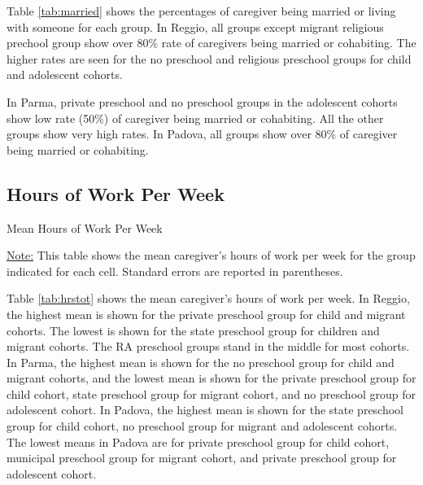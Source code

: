 \documentclass[12pt]{article}
\begin{document}
Table \ref{tab:married} shows the percentages of caregiver being married or living with someone for each group. In Reggio, all groups except migrant religious prechool group show over 80\% rate of caregivers being married or cohabiting. The higher rates are seen for the no preschool and religious preschool groups for child and adolescent cohorts. 

In Parma, private preschool and no preschool groups in the adolescent cohorts show low rate (50\%) of caregiver being married or cohabiting. All the other groups show very high rates. In Padova, all groups show over 80\% of caregiver being married or cohabiting. 


\subsection{Hours of Work Per Week}
\begin{table}[H]
\caption{Mean Hours of Work Per Week} \label{tab:hrstot}
\begin{center}
\scalebox{0.8}{

}
\end{center}
\begin{footnotesize}
\vspace{0.5mm} 

\underline{Note:} This table shows the mean caregiver's hours of work per week for the group indicated for each cell. Standard errors are reported in parentheses.
\end{footnotesize}
\end{table}

Table \ref{tab:hrstot} shows the mean caregiver's hours of work per week. In Reggio, the highest mean is shown for the private preschool group for child and migrant cohorts. The lowest is shown for the state preschool group for children and migrant cohorts. The RA preschool groups stand in the middle for most cohorts. In Parma, the highest mean is shown for the no preschool group for child and migrant cohorts, and the lowest mean is shown for the private preschool group for child cohort, state preschool group for migrant cohort, and no preschool group for adolescent cohort. In Padova, the highest mean is shown for the state preschool group for child cohort, no preschool group for migrant and adolescent cohorts. The lowest means in Padova are for private preschool group for child cohort, municipal preschool group for migrant cohort, and private preschool group for adolescent cohort. 
\end{document}
